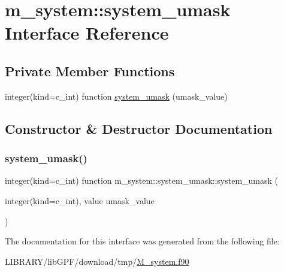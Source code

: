\hypertarget{interfacem__system_1_1system__umask}{}\section{m\+\_\+system\+:\+:system\+\_\+umask Interface Reference}
\label{interfacem__system_1_1system__umask}
\subsection*{Private Member Functions}
\begin{DoxyCompactItemize}
\item 
integer(kind=c\+\_\+int) function \hyperlink{interfacem__system_1_1system__umask_a10fa518062761065afc422f100ed0a76}{system\+\_\+umask} (umask\+\_\+value)
\end{DoxyCompactItemize}


\subsection{Constructor \& Destructor Documentation}
\mbox{\label{interfacem__system_1_1system__umask_a10fa518062761065afc422f100ed0a76}} 
\subsubsection{\texorpdfstring{system\+\_\+umask()}{system\_umask()}}
{\footnotesize\ttfamily integer(kind=c\+\_\+int) function m\+\_\+system\+::system\+\_\+umask\+::system\+\_\+umask (\begin{DoxyParamCaption}\item[{integer(kind=c\+\_\+int), value}]{umask\+\_\+value }\end{DoxyParamCaption})\hspace{0.3cm}{\ttfamily [private]}}



The documentation for this interface was generated from the following file\+:\begin{DoxyCompactItemize}
\item 
L\+I\+B\+R\+A\+R\+Y/lib\+G\+P\+F/download/tmp/\hyperlink{M__system_8f90}{M\+\_\+system.\+f90}\end{DoxyCompactItemize}
